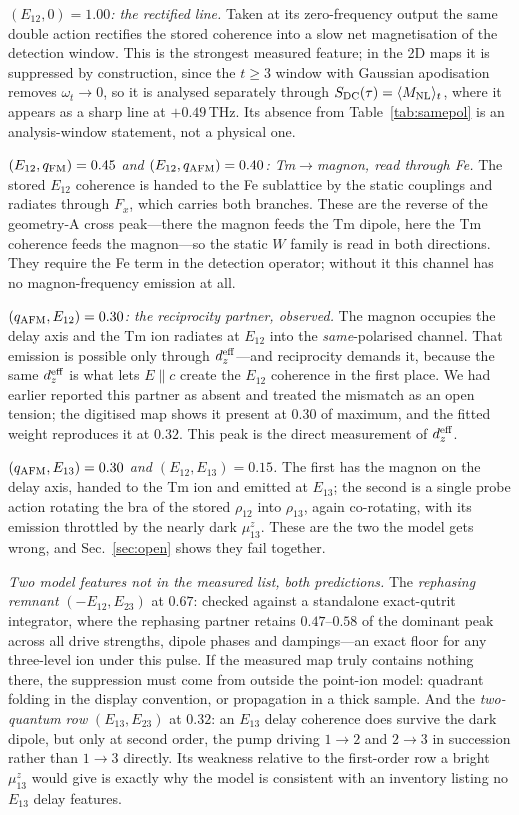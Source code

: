 \documentclass[aps,prb,twocolumn,superscriptaddress,longbibliography]{revtex4-2}
\newcommand{\qafm}{q_{\rm AFM}}
\newcommand{\qfm}{q_{\rm FM}}
\newcommand{\Mnl}{M_{\rm NL}}
\begin{document}
\emph{$(E_{12},0)=1.00$: the rectified line.}  Taken at its
zero-frequency output the same double action rectifies the stored
coherence into a slow net magnetisation of the detection window.  This
is the strongest measured feature; in the 2D maps it is suppressed by
construction, since the $t\geq3$ window with Gaussian apodisation removes
$\omega_t\to0$, so it is analysed separately through
$S_{\rm DC}(\tau)=\langle\Mnl\rangle_t$, where it appears as a sharp
line at $+0.49$\,THz.  Its absence from Table~\ref{tab:samepol} is an
analysis-window statement, not a physical one.

\emph{$(E_{12},\qfm)=0.45$ and $(E_{12},\qafm)=0.40$: Tm$\to$magnon,
read through Fe.}  The stored $E_{12}$ coherence is handed to the Fe
sublattice by the static couplings and radiates through $F_x$, which
carries both branches.  These are the reverse of the geometry-A cross
peak---there the magnon feeds the Tm dipole, here the Tm coherence feeds
the magnon---so the static $W$ family is read in both directions.  They
require the Fe term in the detection operator; without it this channel
has no magnon-frequency emission at all.

\emph{$(\qafm,E_{12})=0.30$: the reciprocity partner, observed.}  The
magnon occupies the delay axis and the Tm ion radiates at $E_{12}$ into
the \emph{same}-polarised channel.  That emission is possible only
through $d_z^{\rm eff}$---and reciprocity demands it, because the same
$d_z^{\rm eff}$ is what lets $E\!\parallel\!c$ create the $E_{12}$
coherence in the first place.  We had earlier reported this partner as
absent and treated the mismatch as an open tension; the digitised map
shows it present at $0.30$ of maximum, and the fitted weight reproduces
it at $0.32$.  This peak is the direct measurement of $d_z^{\rm eff}$.

\emph{$(\qafm,E_{13})=0.30$ and $(E_{12},E_{13})=0.15$.}  The first has
the magnon on the delay axis, handed to the Tm ion and emitted at
$E_{13}$; the second is a single probe action rotating the bra of the
stored $\rho_{12}$ into $\rho_{13}$, again co-rotating, with its emission
throttled by the nearly dark $\mu^z_{13}$.  These are the two the model
gets wrong, and Sec.~\ref{sec:open} shows they fail together.

\emph{Two model features not in the measured list, both predictions.}
The \emph{rephasing remnant} $(-E_{12},E_{23})$ at $0.67$: checked
against a standalone exact-qutrit integrator, where the rephasing partner
retains $0.47$--$0.58$ of the dominant peak across all drive strengths,
dipole phases and dampings---an exact floor for any three-level ion under
this pulse.  If the measured map truly contains nothing there, the
suppression must come from outside the point-ion model: quadrant folding
in the display convention, or propagation in a thick sample.  And the
\emph{two-quantum row} $(E_{13},E_{23})$ at $0.32$: an $E_{13}$ delay
coherence does survive the dark dipole, but only at second order, the
pump driving $1\!\to\!2$ and $2\!\to\!3$ in succession rather than
$1\!\to\!3$ directly.  Its weakness relative to the first-order row a
bright $\mu^z_{13}$ would give is exactly why the model is consistent
with an inventory listing no $E_{13}$ delay features.
\end{document}
